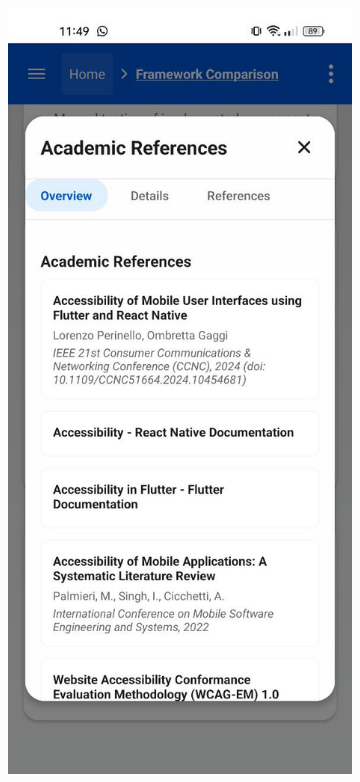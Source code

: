 \begin{figure}[ht]
    \centering
    \begin{subfigure}[b]{0.48\textwidth}
        \centering
        \includegraphics[width=\linewidth, alt={Academic References card displaying an overview of sources}]{img/methodology-academic-overview.jpg}

\end{subfigure}
\end{figure}
